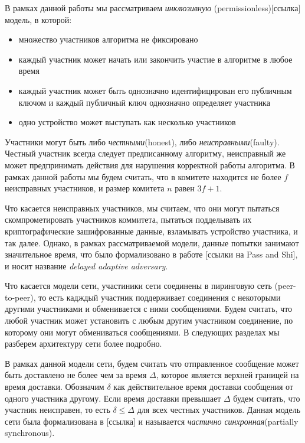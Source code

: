 В рамках данной работы мы рассматриваем \textit{инклюзивную} (permissionless)[ссылка] модель, в которой:
\begin{itemize}
\item множество участников алгоритма не фиксировано
\item каждый участник может начать или закончить участие в алгоритме в любое время
\item каждый участник может быть однозначно идентифицирован его публичным ключом и каждый публичный ключ однозначно определяет участника
\item одно устройство может выступать как несколько участников
\end{itemize}

Участники могут быть либо \textit{честными}(honest), либо \textit{неисправными}(faulty).  Честный участник всегда следует предписанному алгоритму, неисправный же может предпринимать действия для нарушения корректной работы алгоритма.
В рамках данной работы мы будем считать, что в комитете находится не более $f$ неисправных участников, и размер комитета $n$ равен $3f+1$.

Что касается неисправных участников, мы считаем, что они могут пытаться скомпрометировать участников коммитета, пытаться подделывать их криптографические зашифрованные данные, взламывать устройство участника, и так далее. Однако, в рамках рассматриваемой модели, данные попытки занимают значительное время, что было формализовано в работе [ссылки на Pass and Shi], и носит название \textit{delayed adaptive adversary}.

Что касается модели сети, участиники сети соединены в пиринговую сеть (peer-to-peer), 
то есть кадждый участник поддерживает соединения с некоторыми другими участниками и обменивается с ними сообщениями. Будем считать, что любой участник может установить с любым другим участником соединение, по которому они могут обмениваться сообщениями. В следующих разделах мы разберем архитектуру сети более подробно.

В рамках данной модели сети, будем считать что отправленное сообщение может быть доставлено не более чем за время $\Delta$, которое является верхней границей на время доставки. 
Обозначим $\delta$ как действительное время доставки сообщения от одного участника другому. 
Если время доставки превышает $\Delta$ будем считать, что участник неисправен, 
то есть $\delta \le \Delta$ для всех честных участников. 
Данная модель сети была формализована в [ссылка] и называется \textit{частично синхронная}(partially synchronous).

